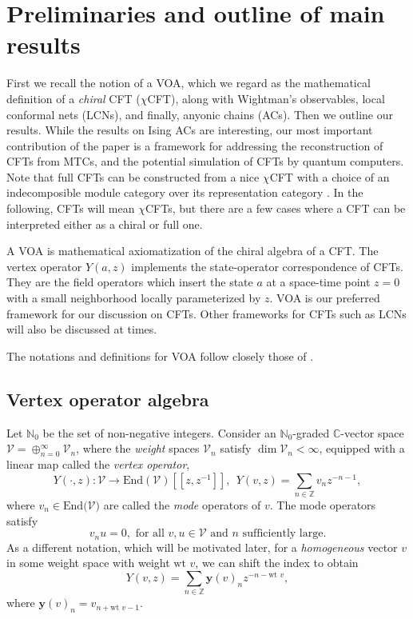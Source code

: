 \documentclass[twoside,11pt,titlepage]{amsart}
\renewcommand{\=}[1]{\stackrel{#1}{=}} %
\theoremstyle{definition}
\theoremstyle{remark}
\begin{document}
\section{Preliminaries and outline of main results}\label{1.}

First we recall the notion of a VOA, which we regard as the mathematical definition of a \textit{chiral} CFT ($\chi$CFT), along with Wightman's observables, local conformal nets (LCNs), and finally, anyonic chains (ACs). Then we outline our results.  While the results on Ising ACs are interesting, our most important contribution of the paper is a framework for addressing the reconstruction of CFTs from MTCs, and the potential simulation of CFTs by quantum computers. Note that full CFTs can be constructed from a nice $\chi$CFT with a choice of an indecomposible module category over its representation category \cite{frs06}.  In the following, CFTs will mean $\chi$CFTs, but there are a few cases where a CFT can be interpreted either as a chiral or full one.

A VOA is mathematical axiomatization of the chiral algebra of a CFT.  The vertex operator $Y(a,z)$ implements the state-operator correspondence of CFTs.  They are the field operators which insert the state $a$ at a space-time point $z=0$ with a small neighborhood locally parameterized by $z$.  VOA is our preferred framework for our discussion on CFTs. Other frameworks for CFTs such as LCNs will also be discussed at times. 

The notations and definitions for VOA follow closely those of \cite{konig2017matrix}.

\subsection{Vertex operator algebra}\label{1.1}

\hfill \break
Let $\mathbb{N}_0$ be the set of non-negative integers.  Consider an $\mathbb{N}_0$-graded $\mathbb{C}$-vector space $\mathcal{V}=\oplus_{n=0}^{\infty} \mathcal{V}_n$, where the \textit{weight} spaces $\mathcal{V}_n$ satisfy $\dim \mathcal{V}_n<\infty$, equipped with a linear map called the \textit{vertex operator}, 
$$Y(\cdot,z):\mathcal{V} \to \text{End}(\mathcal{V})[[z,z^{-1}]], \ \ Y(v,z)=\sum_{n\in \mathbb{Z}} v_nz^{-n-1},$$
where  $v_n \in \text{End}(\mathcal{V)}$ are called the \textit{mode} operators of $v$. The mode operators satisfy
$$v_nu=0, \text{ for all } v,u \in \mathcal{V} \text{ and } n \text{ sufficiently large.}$$
As a different notation, which will be motivated later, for a \textit{homogeneous} vector $v$ in some weight space with weight $\text{wt }v$, we can shift the index to obtain  
$$Y(v,z)=\sum_{n\in \mathbb{Z}} \textbf{y}(v)_nz^{-n-\text{wt }v},$$ 
where $\textbf{y}(v)_n=v_{n+ \text{wt }v-1}$.
\end{document}
